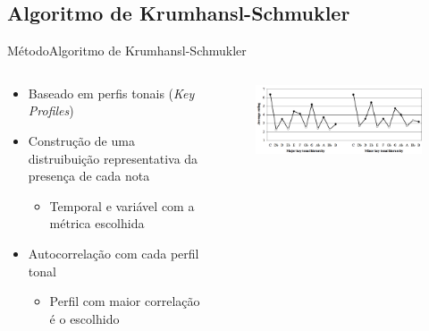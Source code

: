 \subsection{Algoritmo de Krumhansl-Schmukler}
\begin{frame}{Método}{Algoritmo de Krumhansl-Schmukler}
    \begin{columns}[]
        \begin{column}{.5\textwidth}
            \begin{itemize}
                \item Baseado em perfis tonais (\textit{Key Profiles})
                \item Construção de uma distruibuição representativa da presença de cada nota
                \begin{itemize}
                    \item Temporal e variável com a métrica escolhida
                \end{itemize}
                \item Autocorrelação com cada perfil tonal
                \begin{itemize}
                    \item Perfil com maior correlação é o escolhido
                \end{itemize}
            \end{itemize}
        \end{column}
        \begin{column}{.5\textwidth}
            \begin{figure}
                \includegraphics[width=.9\textwidth]{figs/key_profiles_C.png}
            \end{figure}
        \end{column}
    \end{columns}
\end{frame}

